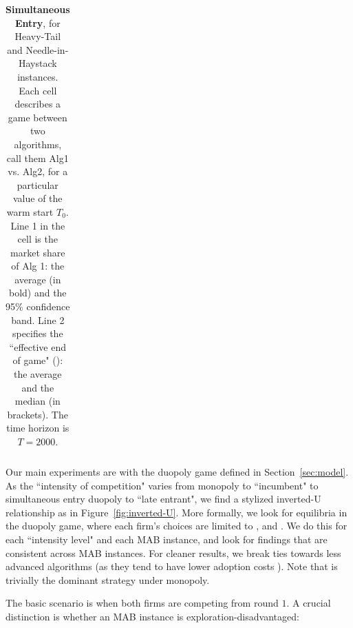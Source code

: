 \documentclass[../competing_bandits_with_appendix.tex]{subfiles}
\begin{document}
\begin{table}[t]
\begin{tabular}{|c|c|c|c||c|c|c|}
  \\
   \hline
\end{tabular}
\normalsize
\caption{{\bf Simultaneous Entry}, for Heavy-Tail and Needle-in-Haystack instances. Each cell describes a game between two algorithms, call them Alg1 vs. Alg2, for a particular value of the warm start $T_0$. Line 1 in the cell is the market share of Alg 1: the average (in bold) and the 95\% confidence band.
Line 2 specifies the ``effective end of game" (\Eeog): the average and the median (in brackets). The time horizon is $T=2000$.}
\label{sim_table}
\end{table}

\normalsize
Our main experiments are with the duopoly game defined in Section~\ref{sec:model}. As the ``intensity of competition" varies from  monopoly to ``incumbent" to simultaneous entry duopoly to ``late entrant", we find a stylized inverted-U relationship as in Figure~\ref{fig:inverted-U}. More formally, we look for equilibria in the duopoly game, where each firm's choices are limited to \DG, \DEG and \TS. We do this for each ``intensity level" and each MAB instance, and look for findings that are consistent across MAB instances. For cleaner results, we break ties towards less advanced algorithms (as they tend to have lower adoption costs \cite{DS-arxiv}). Note that \DG is trivially the dominant strategy under monopoly.



The basic scenario is when both firms are competing from round $1$. A crucial distinction is whether an MAB instance is exploration-disadvantaged:

\end{document}
